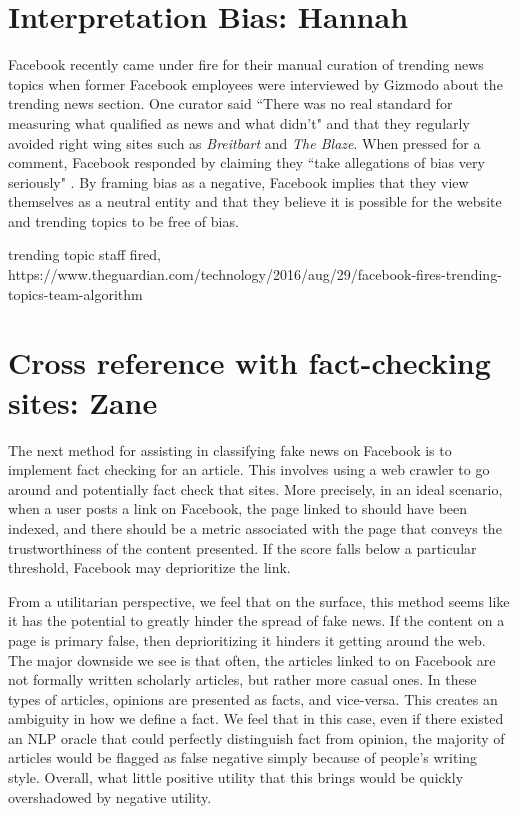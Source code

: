 \documentclass[12pt]{article}
\begin{document}
\section{Interpretation Bias: Hannah}
Facebook recently came under fire for their manual curation of trending news topics when former Facebook employees were interviewed by Gizmodo about the trending news section. One curator said ``There was no real standard for measuring what qualified as news and what didn't" and that they regularly avoided right wing sites such as \textit{Breitbart} and \textit{The Blaze}. When pressed for a comment, Facebook responded by claiming they ``take allegations of bias very seriously" \citep{gizmodo_fb_news_curation}. By framing bias as a negative, Facebook implies that they view themselves as a neutral entity and that they believe it is possible for the website and trending topics to be free of bias.


trending topic staff fired, https://www.theguardian.com/technology/2016/aug/29/facebook-fires-trending-topics-team-algorithm



\section{Cross reference with fact-checking sites: Zane}
The next method for assisting in classifying fake news on Facebook is to implement fact checking for an article. This involves using a web crawler to go around and potentially fact check that sites. More precisely, in an ideal scenario, when a user posts a link on Facebook, the page linked to should have been indexed, and there should be a metric associated with the page that conveys the trustworthiness of the content presented. If the score falls below a particular threshold, Facebook may deprioritize the link.  

From a utilitarian perspective, we feel that on the surface, this method seems like it has the potential to greatly hinder the spread of fake news. If the content on a page is primary false, then deprioritizing it hinders it getting around the web. The major downside we see is that often, the articles linked to on Facebook are not formally written scholarly articles, but rather more casual ones. In these types of articles, opinions are presented as facts, and vice-versa. This creates an ambiguity in how we define a fact. We feel that in this case, even if there existed an NLP oracle that could perfectly distinguish fact from opinion, the majority of articles would be flagged as false negative simply because of people's writing style. Overall, what little positive utility that this brings would be quickly overshadowed by negative utility.
\end{document}

